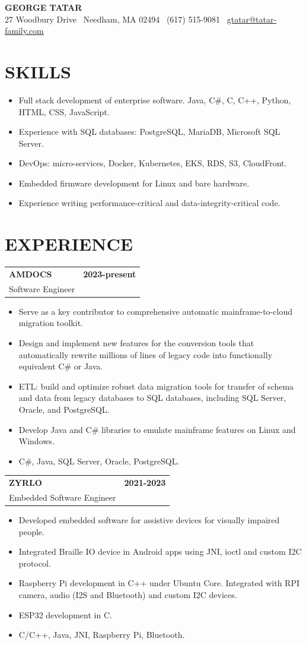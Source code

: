 \documentclass[11pt]{article}
\makeatletter
\newcommand{\resheader}[1]{\section*{#1}\vspace{-4pt}}
\newcommand{\jobheading}[4]{%
  \vspace{6pt}\begin{tabularx}{\textwidth}{@{}X r@{}}
    {\textbf{#1}} & {\textbf{#2}} \\
    {{\normalsize #3}\hspace{0.5em}{\color{muted}·}\hspace{0.5em}{\color{muted}#4}} & {} \\
  \end{tabularx}\vspace{2pt}
}
\makeatother
\begin{document}
{\centering
  {\fontsize{21}{23}\selectfont\bfseries GEORGE TATAR}\\[8pt]
  {\normalsize\color{textgray}27 Woodbury Drive \textbar\ Needham, MA 02494 \textbar\ (617) 515-9081 \textbar\ \href{mailto:gtatar@tatar-family.com}{gtatar@tatar-family.com}}\\
\par}

\resheader{SKILLS}

\begin{itemize}
\item Full stack development of enterprise software. Java, C\#, C, C++, Python, HTML, CSS, JavaScript.
\item Experience with SQL databases: PostgreSQL, MariaDB, Microsoft SQL Server.
\item DevOps: micro-services, Docker, Kubernetes, EKS, RDS, S3, CloudFront.
\item Embedded firmware development for Linux and bare hardware.
\item Experience writing performance-critical and data-integrity-critical code.
\end{itemize}

\resheader{EXPERIENCE}

\jobheading{AMDOCS}{2023-present}{Software Engineer}{Remote}
\begin{itemize}
\item Serve as a key contributor to comprehensive automatic mainframe-to-cloud migration toolkit.
\item Design and implement new features for the conversion tools that automatically rewrite millions of lines of legacy code into functionally equivalent C\# or Java.
\item ETL: build and optimize robust data migration tools for transfer of schema and data from legacy databases to SQL databases, including SQL Server, Oracle, and PostgreSQL.
\item Develop Java and C\# libraries to emulate mainframe features on Linux and Windows.
\item C\#, Java, SQL Server, Oracle, PostgreSQL.
\end{itemize}

\jobheading{ZYRLO}{2021-2023}{Embedded Software Engineer}{Sudbury, MA}
\begin{itemize}
\item Developed embedded software for assistive devices for visually impaired people.
\item Integrated Braille IO device in Android apps using JNI, ioctl and custom I2C protocol.
\item Raspberry Pi development in C++ under Ubuntu Core. Integrated with RPI camera, audio (I2S and Bluetooth) and custom I2C devices.
\item ESP32 development in C.
\item C/C++, Java, JNI, Raspberry Pi, Bluetooth.
\end{itemize}
\end{document}
